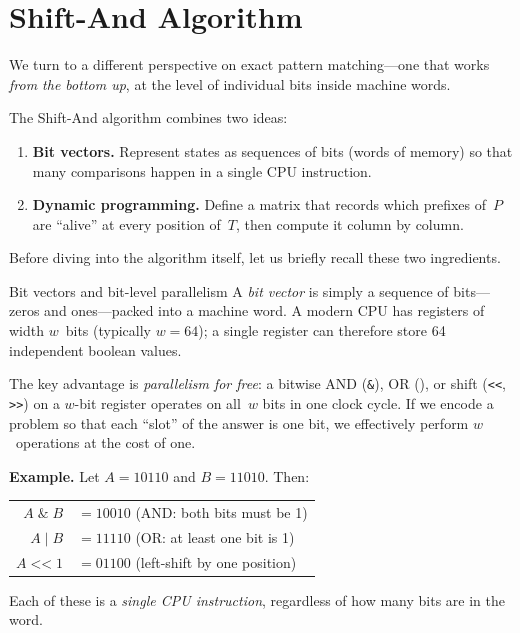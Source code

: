 \section{Shift-And Algorithm}
\label{sec:shift-and}

We turn to a different perspective on exact pattern matching---one that works
\emph{from the bottom up}, at the level of individual bits inside machine words.


The Shift-And algorithm combines two ideas:
\begin{enumerate}[nosep]
  \item \textbf{Bit vectors.}  Represent states as sequences of bits (words of
        memory) so that many comparisons happen in a single CPU instruction.
  \item \textbf{Dynamic programming.}  Define a matrix that records which
        prefixes of~$P$ are ``alive'' at every position of~$T$, then compute it
        column by column.
\end{enumerate}

Before diving into the algorithm itself, let us briefly recall these two
ingredients.

\begin{intermezzo}{Bit vectors and bit-level parallelism}
A \emph{bit vector} is simply a sequence of bits---zeros and ones---packed into
a machine word.  A modern CPU has registers of width $w$~bits (typically
$w = 64$); a single register can therefore store 64 independent boolean values.

The key advantage is \emph{parallelism for free}: a bitwise AND (\texttt{\&}),
OR (\texttt{\textbar}), or shift (\texttt{<{}<}, \texttt{>{}>}) on a $w$-bit register
operates on all~$w$ bits in one clock cycle.  If we encode a problem so that
each ``slot'' of the answer is one bit, we effectively perform $w$~operations at
the cost of one.

\smallskip\noindent
\textbf{Example.}  Let $A = 10110$ and $B = 11010$.  Then:
\begin{center}
\begin{tabular}{rl}
  $A \;\texttt{\&}\; B$ & $= 10010$ \quad (AND: both bits must be 1) \\
  $A \;\texttt{|}\; B$  & $= 11110$ \quad (OR: at least one bit is 1) \\
  $A \;\texttt{<{}<}\; 1$ & $= 01100$ \quad (left-shift by one position)
\end{tabular}
\end{center}
Each of these is a \emph{single CPU instruction}, regardless of how many bits
are in the word.
\end{intermezzo}

